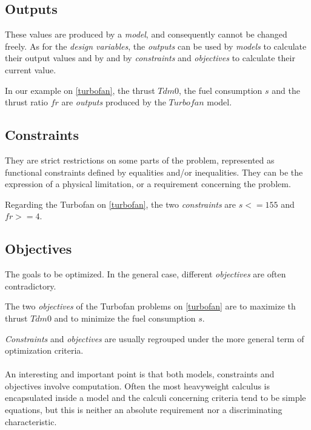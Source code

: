 \subsection{Outputs}

These values are produced by a \emph{model}, and consequently cannot be changed freely.
As for the \emph{design variables}, the \emph{outputs} can be used by \emph{models} to calculate their output values and by and by \emph{constraints} and \emph{objectives} to calculate their current value.

In our example on \figurename{} \ref{turbofan}, the thrust $Tdm0$, the fuel consumption $s$ and the thrust ratio $fr$ are \emph{outputs} produced by the $Turbofan$ model.

\subsection{Constraints}

They are strict restrictions on some parts of the problem, represented as functional constraints defined by equalities and/or inequalities. They can be the expression of a physical limitation, or a requirement concerning the problem.

Regarding the Turbofan on \figurename{} \ref{turbofan}, the two \emph{constraints} are $s <= 155$ and $fr >=4$.

\subsection{Objectives}

The goals to be optimized. In the general case, different \emph{objectives} are often contradictory.

The two \emph{objectives} of the Turbofan problems on \figurename{} \ref{turbofan} are to maximize th thrust $Tdm0$ and to minimize the fuel consumption $s$.

\emph{Constraints} and \emph{objectives} are usually regrouped under the more general term of optimization criteria. 

\paragraph*{}
An interesting and important point is that both models, constraints and objectives involve computation. Often the most heavyweight calculus is encapsulated inside a model and the calculi concerning criteria tend to be simple equations, but this is neither an absolute requirement nor a discriminating characteristic.

